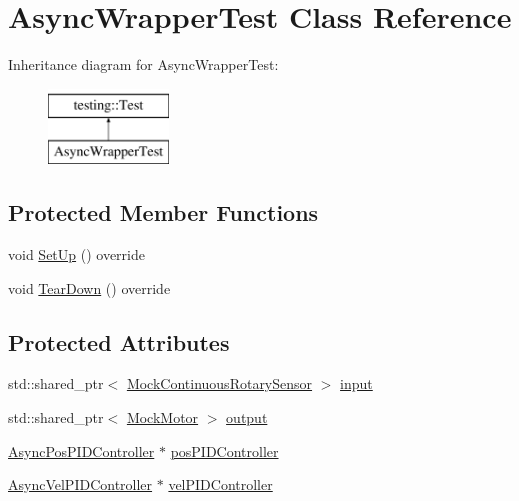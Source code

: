 \hypertarget{classAsyncWrapperTest}{}\section{Async\+Wrapper\+Test Class Reference}
\label{classAsyncWrapperTest}
Inheritance diagram for Async\+Wrapper\+Test\+:\begin{figure}[H]
\begin{center}
\leavevmode
\includegraphics[height=2.000000cm]{classAsyncWrapperTest}
\end{center}
\end{figure}
\subsection*{Protected Member Functions}
\begin{DoxyCompactItemize}
\item 
void \mbox{\hyperlink{classAsyncWrapperTest_afa76a8945a58c9c2ad9e1cd718436671}{Set\+Up}} () override
\item 
void \mbox{\hyperlink{classAsyncWrapperTest_ab19074e811df43bfa1b5d5c3f424f971}{Tear\+Down}} () override
\end{DoxyCompactItemize}
\subsection*{Protected Attributes}
\begin{DoxyCompactItemize}
\item 
std\+::shared\+\_\+ptr$<$ \mbox{\hyperlink{classokapi_1_1MockContinuousRotarySensor}{Mock\+Continuous\+Rotary\+Sensor}} $>$ \mbox{\hyperlink{classAsyncWrapperTest_ad8492f884aa6cabc6ea5762942c2b70b}{input}}
\item 
std\+::shared\+\_\+ptr$<$ \mbox{\hyperlink{classokapi_1_1MockMotor}{Mock\+Motor}} $>$ \mbox{\hyperlink{classAsyncWrapperTest_a1b4ce21413572978d9cb17156b9f41db}{output}}
\item 
\mbox{\hyperlink{classokapi_1_1AsyncPosPIDController}{Async\+Pos\+P\+I\+D\+Controller}} $\ast$ \mbox{\hyperlink{classAsyncWrapperTest_a2381d6d33efec0bcb7a21cd271419ac0}{pos\+P\+I\+D\+Controller}}
\item 
\mbox{\hyperlink{classokapi_1_1AsyncVelPIDController}{Async\+Vel\+P\+I\+D\+Controller}} $\ast$ \mbox{\hyperlink{classAsyncWrapperTest_a56ae70e6dbe1f6eee1d4e1abda8e00c3}{vel\+P\+I\+D\+Controller}}
\end{DoxyCompactItemize}
